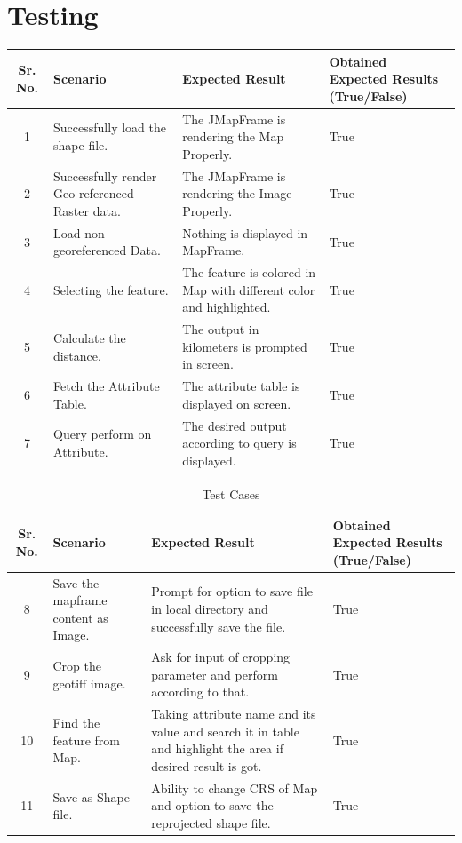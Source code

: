 \chapter{Testing}
\begin{table}[h]
\begin{tabular}{|c|p{5cm}|p{5cm}|p{3cm}|}
  \hline
  Sr. No. & Scenario & Expected Result & Obtained Expected Results (True/False)\\
  \hline
  1 & Successfully load the shape file. & The JMapFrame is rendering the Map Properly. & True\\
  \hline
  2 & Successfully render Geo-referenced Raster data. & The JMapFrame is rendering the Image Properly. & True\\
  \hline
  3 & Load non-georeferenced Data. & Nothing is displayed in MapFrame. & True\\
  \hline
  4	& Selecting the feature. & The feature is colored in Map with different color and highlighted. & True\\
  \hline
  5 & Calculate the distance. & The output in kilometers is prompted in screen. & True\\
  \hline
  6 & Fetch the Attribute Table. & The attribute table is displayed on screen. & True\\
  \hline
  7 & Query perform on Attribute. & The desired output according to query is displayed. & True\\
  \hline
  \end{tabular}
  \end{table}
  \newpage
  \begin{table}[h]
  \begin{tabular}{|c|p{5cm}|p{5cm}|p{3cm}|}
  \hline
  Sr. No. & Scenario & Expected Result & Obtained Expected Results (True/False)\\
  \hline
  8 & Save the mapframe content as Image. & Prompt for option to save file in local directory and successfully save the file. & True\\
  \hline
  9 & Crop the geotiff image. & Ask for input of cropping parameter and perform according to that. & True\\
  \hline
  10 & Find the feature from Map. & Taking attribute name and its value and search it in table and highlight the area if desired result is got. & True\\
  \hline
  11 & Save as Shape file. & Ability to change CRS of Map and option to save the reprojected shape file. & True\\
  \hline
\end{tabular}
\caption[Test cases]{Test Cases}
\end{table}

